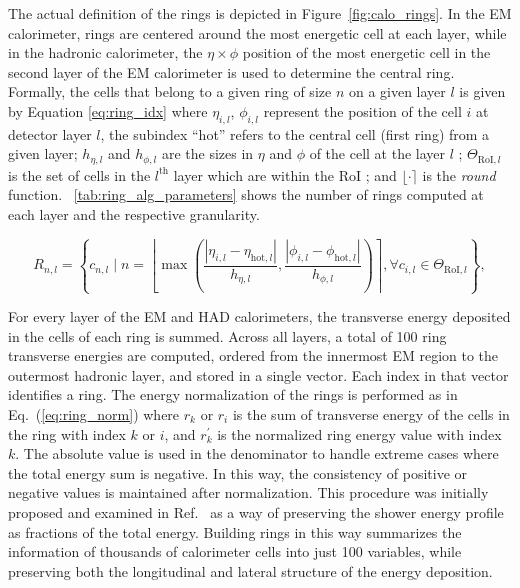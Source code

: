 The actual definition of the rings is depicted in Figure~\ref{fig:calo_rings}. In the EM calorimeter, rings are centered around the most energetic cell at each layer, while in the
hadronic calorimeter, the $\eta \times \phi$ position of the most energetic cell
in the second layer of the EM calorimeter is used to determine the central ring.
Formally, the cells that belong to a given ring of size $n$ on a given layer $l$ is given by Equation \ref{eq:ring_idx} where $\eta_{i,l}$, $\phi_{i,l}$ represent the position of the cell $i$ at detector layer $l$, the subindex ``hot'' refers to the central cell (first ring) from a given layer; 
$h_{\eta,l}$  and $h_{\phi,l}$ are the sizes in $\eta$ and $\phi$ of the cell at the layer $l$ ; $\Theta_{\text{RoI},l}$ is the set of cells
in the $l^{\text{th}}$ layer which are within the RoI ; and $\lfloor \cdot \rceil$ is the \textit{round} function.
\tablename~\ref{tab:ring_alg_parameters} shows the number of rings computed at each layer and the respective granularity.


\begin{equation}
\label{eq:ring_idx}
R_{n,l} = \left\{c_{n,l} \mid n = \left\lfloor \max{\left( 
\frac{| \eta_{i,l} - \eta_{\text{hot},l} |}{h_{\eta,l}}, 
\frac{| \phi_{i,l} - \phi_{\text{hot},l} |}{h_{\phi,l}} 
\right)} \right\rceil, 
\forall c_{i,l} \in
\Theta_{\text{RoI},l}
\right\},
\end{equation}






For every layer of the EM and HAD calorimeters, the transverse energy deposited in the cells of each ring is summed. %
Across all layers, a total of 100 ring transverse energies are computed, ordered from the innermost EM region to the outermost hadronic layer, and stored in a single vector. Each index in that vector identifies a ring. 
The energy normalization of the rings is performed as in Eq.~(\ref{eq:ring_norm})
where $r_k$ or $r_i$ is the sum of transverse energy of the cells in the ring with index $k$ or $i$, and $r^\prime_{k}$ is the normalized ring energy value with index $k$.
The absolute value is used in the denominator to handle extreme cases where the total energy sum is negative. In this way, the consistency of positive or negative values is maintained after normalization. This procedure was initially proposed and examined in Ref.~\cite{1995_seixas_ringer} as a way of preserving the shower energy profile as fractions of the total energy. Building rings in this way summarizes the information of thousands of calorimeter cells into just 100 variables, while preserving both the longitudinal and lateral structure of the energy deposition.

